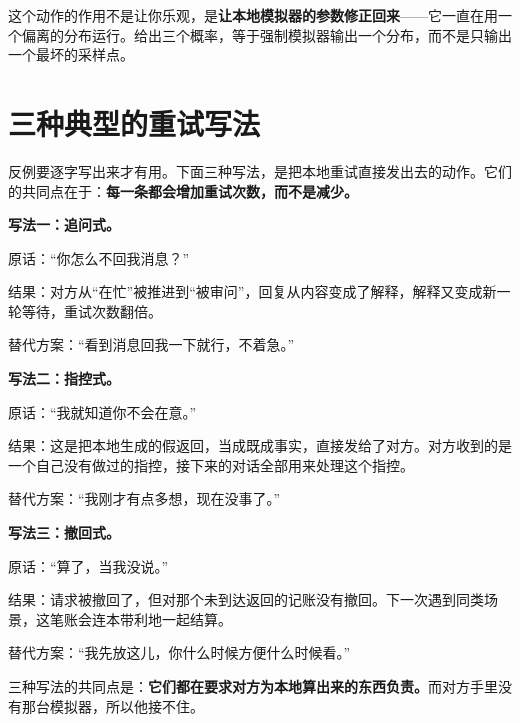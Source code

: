这个动作的作用不是让你乐观，是\textbf{让本地模拟器的参数修正回来}——它一直在用一个偏离的分布运行。给出三个概率，等于强制模拟器输出一个分布，而不是只输出一个最坏的采样点。

\section{三种典型的重试写法}

反例要逐字写出来才有用。下面三种写法，是把本地重试直接发出去的动作。它们的共同点在于：\textbf{每一条都会增加重试次数，而不是减少。}

\textbf{写法一：追问式。}

\begin{mdquote}
原话：“你怎么不回我消息？”\par
\vspace{0.3\baselineskip}
结果：对方从“在忙”被推进到“被审问”，回复从内容变成了解释，解释又变成新一轮等待，重试次数翻倍。\par
\vspace{0.3\baselineskip}
替代方案：“看到消息回我一下就行，不着急。”
\end{mdquote}

\textbf{写法二：指控式。}

\begin{mdquote}
原话：“我就知道你不会在意。”\par
\vspace{0.3\baselineskip}
结果：这是把本地生成的假返回，当成既成事实，直接发给了对方。对方收到的是一个自己没有做过的指控，接下来的对话全部用来处理这个指控。\par
\vspace{0.3\baselineskip}
替代方案：“我刚才有点多想，现在没事了。”
\end{mdquote}

\textbf{写法三：撤回式。}

\begin{mdquote}
原话：“算了，当我没说。”\par
\vspace{0.3\baselineskip}
结果：请求被撤回了，但对那个未到达返回的记账没有撤回。下一次遇到同类场景，这笔账会连本带利地一起结算。\par
\vspace{0.3\baselineskip}
替代方案：“我先放这儿，你什么时候方便什么时候看。”
\end{mdquote}

三种写法的共同点是：\textbf{它们都在要求对方为本地算出来的东西负责。}而对方手里没有那台模拟器，所以他接不住。

